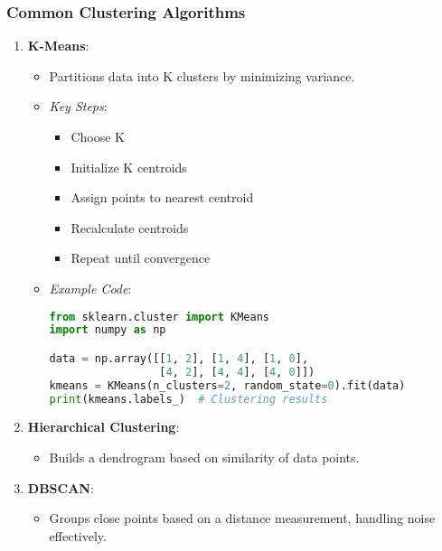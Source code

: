 \documentclass[aspectratio=169]{beamer}
\begin{document}
\begin{frame}[fragile]
    \frametitle{Common Clustering Algorithms}

    \begin{enumerate}
        \item \textbf{K-Means}:
        \begin{itemize}
            \item Partitions data into K clusters by minimizing variance.
            \item \textit{Key Steps}:
            \begin{itemize}
                \item Choose K
                \item Initialize K centroids
                \item Assign points to nearest centroid
                \item Recalculate centroids
                \item Repeat until convergence
            \end{itemize}
            \item \textit{Example Code}:
            \begin{lstlisting}[language=Python]
from sklearn.cluster import KMeans
import numpy as np

data = np.array([[1, 2], [1, 4], [1, 0],
                 [4, 2], [4, 4], [4, 0]])
kmeans = KMeans(n_clusters=2, random_state=0).fit(data)
print(kmeans.labels_)  # Clustering results
            \end{lstlisting}
        \end{itemize}

        \item \textbf{Hierarchical Clustering}:
        \begin{itemize}
            \item Builds a dendrogram based on similarity of data points.
        \end{itemize}

        \item \textbf{DBSCAN}:
        \begin{itemize}
            \item Groups close points based on a distance measurement, handling noise effectively.
        \end{itemize}
    \end{enumerate}
\end{frame}
\end{document}
